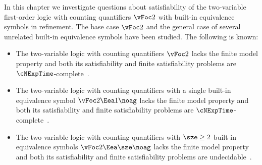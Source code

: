 In this chapter we investigate questions about satisfiability of the
two-variable first-order logic with counting quantifiers $\vFoc2$
with built-in equivalence symbols in refinement.
The base case $\vFoc2$ and the general case of several unrelated built-in
equivalence symbols have been studied. The following is known:
\begin{itemize}
  \item
  The two-variable logic with counting quantifiers $\vFoc2$ lacks the
  finite model property and both its satisfiability and finite satisfiability
  problems are $\cNExpTime$-complete~\cite{Pratt-Hartmann2005}.
  \item
  The two-variable logic with counting quantifiers with a single built-in
  equivalence symbol $\vFoc2\Eea1\noag$ lacks the finite model property and both
  its satisfiability and finite satisfiability problems are
  $\cNExpTime$-complete~\cite{MALQ:MALQ201400102}.
  \item
  The two-variable logic with counting quantifiers with $\sze\geq2$ built-in
  equivalence symbols $\vFoc2\Eea\sze\noag$ lacks the finite model property and
  both its satisfiability and finite satisfiability problems are
  undecidable~\cite{MALQ:MALQ201400102}.
\end{itemize}

